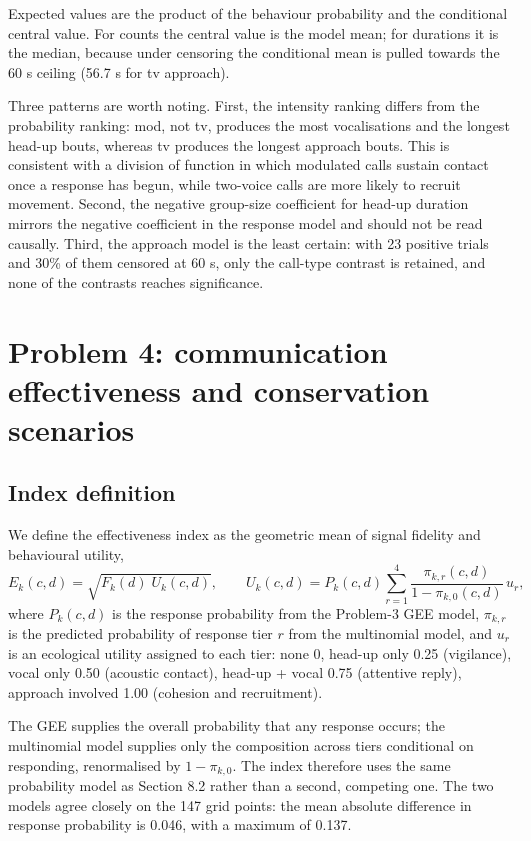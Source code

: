 \documentclass{apmcmthesis}
\begin{document}
Expected values are the product of the behaviour probability and the conditional central value.
For counts the central value is the model mean; for durations it is the median, because under
censoring the conditional mean is pulled towards the 60 s ceiling (56.7 s for tv approach).

Three patterns are worth noting. First, the intensity ranking differs from the probability
ranking: mod, not tv, produces the most vocalisations and the longest head-up bouts, whereas tv
produces the longest approach bouts. This is consistent with a division of function in which
modulated calls sustain contact once a response has begun, while two-voice calls are more likely
to recruit movement. Second, the negative group-size coefficient for head-up duration mirrors
the negative coefficient in the response model and should not be read causally. Third, the
approach model is the least certain: with 23 positive trials and 30\% of them censored at 60 s,
only the call-type contrast is retained, and none of the contrasts reaches significance.

\section{Problem 4: communication effectiveness and conservation scenarios}

\subsection{Index definition}
We define the effectiveness index as the geometric mean of signal fidelity and behavioural
utility,
\begin{equation}
E_k(c,d)=\sqrt{F_k(d)\;U_k(c,d)},\qquad
U_k(c,d)=P_k(c,d)\sum_{r=1}^{4}\frac{\pi_{k,r}(c,d)}{1-\pi_{k,0}(c,d)}\,u_r ,
\end{equation}
where $P_k(c,d)$ is the response probability from the Problem-3 GEE model, $\pi_{k,r}$ is the
predicted probability of response tier $r$ from the multinomial model, and $u_r$ is an
ecological utility assigned to each tier: none 0, head-up only 0.25 (vigilance), vocal only
0.50 (acoustic contact), head-up + vocal 0.75 (attentive reply), approach involved 1.00
(cohesion and recruitment).

The GEE supplies the overall probability that any response occurs; the multinomial model
supplies only the composition across tiers conditional on responding, renormalised by
$1-\pi_{k,0}$. The index therefore uses the same probability model as Section 8.2 rather than a
second, competing one. The two models agree closely on the 147 grid points: the mean absolute
difference in response probability is 0.046, with a maximum of 0.137.
\end{document}
